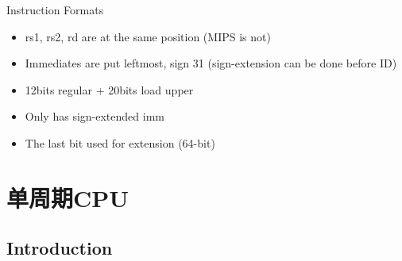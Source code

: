 \documentclass{myslide}
\begin{document}
\begin{frame}{Instruction Formats}
\begin{itemize}
	\item rs1, rs2, rd are at the same position (MIPS is not)
	\item Immediates are put leftmost, sign 31 (sign-extension can be done before ID)
	\item 12bits regular + 20bits load upper
	\item Only has sign-extended imm
	\item The last bit used for extension (64-bit)
\end{itemize}
\end{frame}

\section{单周期CPU}
\begin{frame}
\sectionpage
\end{frame}

\subsection{Introduction}
\begin{frame}
\subsectionpage
\end{frame}
\end{document}
